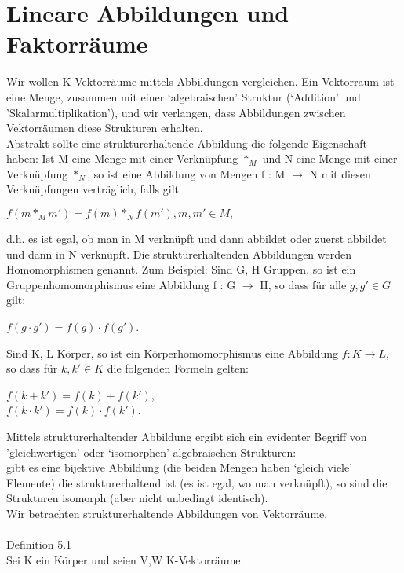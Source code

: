 \section{Lineare Abbildungen und Faktorräume}
Wir wollen K-Vektorräume mittels Abbildungen vergleichen. Ein Vektorraum ist eine Menge, zusammen mit einer ‘algebraischen’ Struktur (‘Addition’ und ’Skalarmultiplikation’), und wir verlangen, dass Abbildungen zwischen Vektorräumen diese Strukturen erhalten.\\ 
Abstrakt sollte eine strukturerhaltende Abbildung die folgende Eigenschaft haben: Ist M eine Menge mit einer Verknüpfung $*_M$ und N eine Menge mit einer Verknüpfung $*_N$, so ist eine Abbildung von Mengen f : M $\to$ N mit diesen Verknüpfungen verträglich, falls gilt
\begin{center}
$f (m *_M m') = f (m) *_N f(m'), m,m' \in M,$
\end{center}
d.h. es ist egal, ob man in M verknüpft und dann abbildet oder zuerst abbildet und dann in N verknüpft. Die strukturerhaltenden Abbildungen werden Homomorphismen genannt. 
Zum Beispiel: Sind G, H Gruppen, so ist ein Gruppenhomomorphismus eine Abbildung f : G $\to$ H, so dass für alle $g,g' \in G$ gilt:
\begin{center}
$f (g \cdot g') = f(g) \cdot f(g')$.
\end{center}
Sind K, L Körper, so ist ein Körperhomomorphismus eine Abbildung $f : K \to L$, so dass für $k, k' \in K$ die folgenden Formeln gelten:
\begin{center}
$f(k + k') = f(k) + f(k')$,\\ 
$f(k \cdot k') = f(k) \cdot f(k')$.
\end{center}
Mittels strukturerhaltender Abbildung ergibt sich ein evidenter Begriff von ’gleichwertigen’ oder ‘isomorphen’ algebraischen Strukturen:\\ 
gibt es eine bijektive Abbildung (die beiden Mengen haben ‘gleich viele’ Elemente) die strukturerhaltend ist (es ist egal, wo man verknüpft), so sind die Strukturen isomorph (aber nicht unbedingt identisch).\\
Wir betrachten strukturerhaltende Abbildungen von Vektorräume.\\
\\
Definition 5.1\\
Sei K ein Körper und seien V,W K-Vektorräume.
